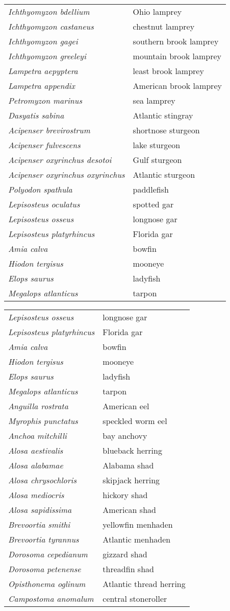 \documentclass[11pt]{article}
\begin{document}
\thispagestyle{plain}

%
\textbf{\Student}

\begin{tabular}{@{}L{3in}L{3in}@{}}
\textit{Ichthyomyzon bdellium} &   Ohio lamprey\tabularnewline
\textit{Ichthyomyzon castaneus} &   chestnut lamprey\tabularnewline
\textit{Ichthyomyzon gagei} &   southern brook lamprey\tabularnewline
\textit{Ichthyomyzon greeleyi} &   mountain brook lamprey\tabularnewline
\textit{Lampetra aepyptera} &   least brook lamprey\tabularnewline
\textit{Lampetra appendix} &   American brook lamprey\tabularnewline
\textit{Petromyzon marinus} &   sea lamprey\tabularnewline
\textit{Dasyatis sabina} &   Atlantic stingray\tabularnewline
\textit{Acipenser brevirostrum} &   shortnose sturgeon\tabularnewline
\textit{Acipenser fulvescens} &   lake sturgeon\tabularnewline
\textit{Acipenser oxyrinchus desotoi} &   Gulf sturgeon\tabularnewline
\textit{Acipenser oxyrinchus oxyrinchus} &   Atlantic sturgeon\tabularnewline
\textit{Polyodon spathula} &   paddlefish\tabularnewline
\textit{Lepisosteus oculatus} &   spotted gar\tabularnewline
\textit{Lepisosteus osseus} &   longnose gar\tabularnewline
\textit{Lepisosteus platyrhincus} &   Florida gar\tabularnewline
\textit{Amia calva} &   bowfin\tabularnewline
\textit{Hiodon tergisus} &   mooneye\tabularnewline
\textit{Elops saurus} &   ladyfish\tabularnewline
\textit{Megalops atlanticus} &   tarpon\tabularnewline
\end{tabular}

\vspace{\baselineskip}

%
\textbf{\Student}

\begin{tabular}{@{}L{3in}L{3in}@{}}
\textit{Lepisosteus osseus} &   longnose gar\tabularnewline
\textit{Lepisosteus platyrhincus} &   Florida gar\tabularnewline
\textit{Amia calva} &   bowfin\tabularnewline
\textit{Hiodon tergisus} &   mooneye\tabularnewline
\textit{Elops saurus} &   ladyfish\tabularnewline
\textit{Megalops atlanticus} &   tarpon\tabularnewline
\textit{Anguilla rostrata} &   American eel\tabularnewline
\textit{Myrophis punctatus} &   speckled worm eel\tabularnewline
\textit{Anchoa mitchilli} &   bay anchovy\tabularnewline
\textit{Alosa aestivalis} &   blueback herring\tabularnewline
\textit{Alosa alabamae} &   Alabama shad\tabularnewline
\textit{Alosa chrysochloris} &   skipjack herring\tabularnewline
\textit{Alosa mediocris} &   hickory shad\tabularnewline
\textit{Alosa sapidissima} &   American shad\tabularnewline
\textit{Brevoortia smithi} &   yellowfin menhaden\tabularnewline
\textit{Brevoortia tyrannus} &   Atlantic menhaden\tabularnewline
\textit{Dorosoma cepedianum} &   gizzard shad\tabularnewline
\textit{Dorosoma petenense} &   threadfin shad\tabularnewline
\textit{Opisthonema oglinum} &   Atlantic thread herring\tabularnewline
\textit{Campostoma anomalum} &   central stoneroller\tabularnewline
\end{tabular}
\end{document}
